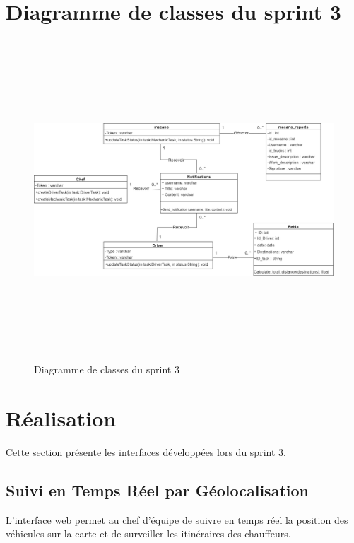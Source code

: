 \newpage
\section{Diagramme de classes du sprint 3}

\begin{figure}[ht!]
    \centering
    \includegraphics[width=1.1\textwidth,height=12cm]{chap5.images/class sprint 3.png}
    \caption{Diagramme de classes du sprint 3}

\end{figure}



\newpage
\section{Réalisation}

Cette section présente les interfaces développées lors du sprint 3.

\subsection{Suivi en Temps Réel par Géolocalisation}

L'interface web permet au chef d'équipe de suivre en temps réel la position des véhicules sur la carte et de surveiller les itinéraires des chauffeurs.

